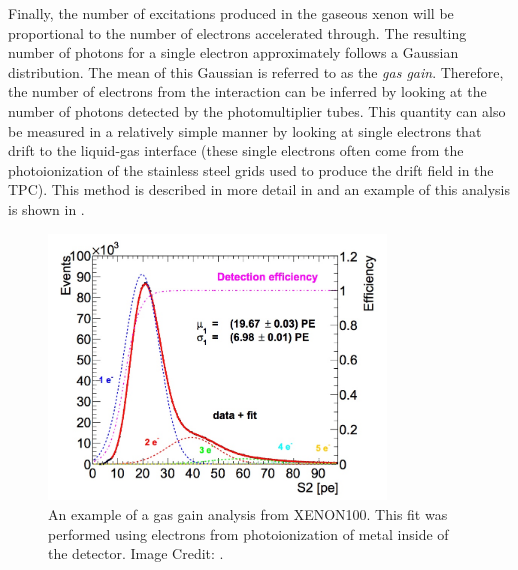 Finally, the number of excitations produced in the gaseous xenon will be proportional to the number of electrons accelerated through.  The resulting number of photons for a single electron approximately follows a Gaussian distribution.  The mean of this Gaussian is referred to as the \textit{gas gain}.  Therefore, the number of electrons from the interaction can be inferred by looking at the number of photons detected by the photomultiplier tubes.  This quantity can also be measured in a relatively simple manner by looking at single electrons that drift to the liquid-gas interface (these single electrons often come from the photoionization of the stainless steel grids used to produce the drift field in the TPC).  This method is described in more detail in  and an example of this analysis is shown in .

 \begin{figure}[t]
	\centering
	\includegraphics[width=0.8\textwidth]{tpc_gas_gain}
	\caption{An example of a gas gain analysis from XENON100.  This fit was performed using electrons from photoionization of metal inside of the detector.  Image Credit: .}
	\label{fig:tpc_gas_gain}
\end{figure}


